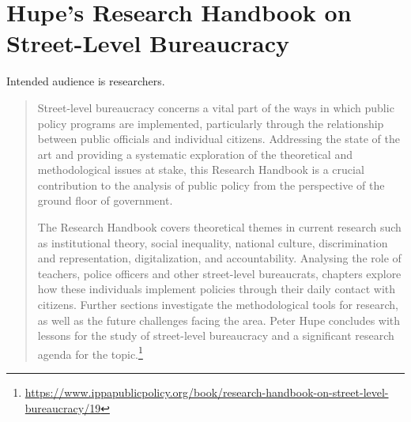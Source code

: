 \section{Hupe's Research Handbook on Street-Level Bureaucracy}
\cite{2019_Hupe}


Intended audience is researchers.


\begin{quote}
Street-level bureaucracy concerns a vital part of the ways in which public policy programs are implemented, particularly through the relationship between public officials and individual citizens. Addressing the state of the art and providing a systematic exploration of the theoretical and methodological issues at stake, this Research Handbook is a crucial contribution to the analysis of public policy from the perspective of the ground floor of government. 

The Research Handbook covers theoretical themes in current research such as institutional theory, social inequality, national culture, discrimination and representation, digitalization, and accountability. Analysing the role of teachers, police officers and other street-level bureaucrats, chapters explore how these individuals implement policies through their daily contact with citizens. Further sections investigate the methodological tools for research, as well as the future challenges facing the area. Peter Hupe concludes with lessons for the study of street-level bureaucracy and a significant research agenda for the topic.\footnote{\href{https://www.ippapublicpolicy.org/book/research-handbook-on-street-level-bureaucracy/19}{https://www.ippapublicpolicy.org/book/research-handbook-on-street-level-bureaucracy/19}}
\end{quote}